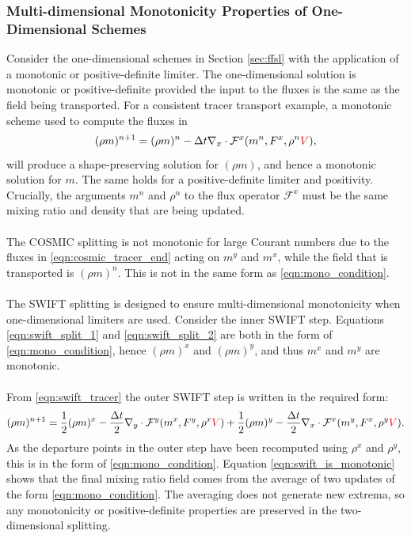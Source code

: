 \documentclass{ametsocV6.1}
\newcommand{\change}[1]{\textcolor{red}{#1}}
\begin{document}
\subsubsection{Multi-dimensional Monotonicity Properties of One-Dimensional Schemes}
Consider the one-dimensional schemes in Section \ref{sec:ffsl} with the application of a monotonic or positive-definite limiter. The one-dimensional solution is monotonic or positive-definite provided the input to the fluxes is the same as the field being transported. For a consistent tracer transport example, a monotonic scheme used to compute the fluxes in
\begin{equation} \label{eqn:mono_condition}
    (\rho m)^{n+1} = (\rho m)^n - \Delta{t} \nabla_x\cdot \mathcal{F}^x(m^n, F^x, \rho^n\change{V}), 
\end{equation}
will produce a shape-preserving solution for $(\rho m)$, and hence a monotonic solution for $m$. The same holds for a positive-definite limiter and positivity.
Crucially, the arguments $m^n$ and $\rho^n$ to the flux operator $\mathcal{F}^x$ must be the same mixing ratio and density that are being updated. \\
\\
The COSMIC splitting is not monotonic for large Courant numbers due to the fluxes in \eqref{eqn:cosmic_tracer_end} acting on $m^y$ and $m^x$, while the field that is transported is $(\rho m)^n$. This is not in the same form as \eqref{eqn:mono_condition}. \\ 
\\
The SWIFT splitting is designed to ensure multi-dimensional monotonicity when one-dimensional limiters are used. Consider the inner SWIFT step. Equations \eqref{eqn:swift_split_1} and \eqref{eqn:swift_split_2} are both in the form of \eqref{eqn:mono_condition}, hence $(\rho m)^x$ and $(\rho m)^y$, and thus $m^x$ and $m^y$ are monotonic. \\
\\
From \eqref{eqn:swift_tracer} the outer SWIFT step is written in the required form:
\begin{equation}
    (\rho m)^{n+1}  = \frac{1}{2}(\rho m)^x  -\frac{\Delta{t}}{2}\nabla_y\cdot \mathcal{F}^y(m^x,F^{y},\rho^x\change{V}) +  \frac{1}{2}(\rho m)^y - \frac{\Delta{t}}{2}\nabla_x\cdot \mathcal{F}^x(m^y,F^{x},\rho^y\change{V}). \label{eqn:swift_is_monotonic}
\end{equation}
As the departure points in the outer step have been recomputed using $\rho^x$ and $\rho^y$, this is in the form of \eqref{eqn:mono_condition}.
Equation \eqref{eqn:swift_is_monotonic} shows that the final mixing ratio field comes from the average of two updates of the form \eqref{eqn:mono_condition}.
The averaging does not generate new extrema, so any monotonicity or positive-definite properties are preserved in the two-dimensional splitting.
\end{document}

